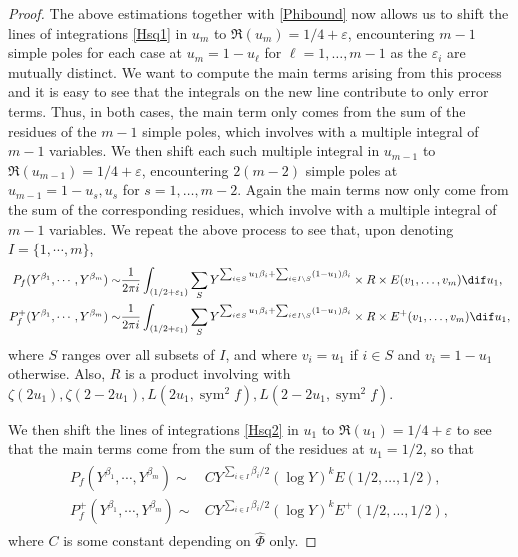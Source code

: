 \documentclass[twoside,leqno,10pt, A4]{amsart}
\begin{document}
\begin{proof}
    The above estimations together with \eqref{Phibound} now allows us to shift the lines of integrations \eqref{Hsq1} in $u_m$ to $\Re(u_m)=1/4+\varepsilon$,  encountering $m-1$ simple poles for each case at $u_m=1-u_{\ell}$ for $\ell=1,\dots, m-1$ as the $\varepsilon_i$ are mutually distinct. We want to compute the main terms arising from this process and it is easy to see that the integrals on the new line contribute to only error terms. Thus, in both cases, the main term only comes from the sum of the residues of the $m-1$ simple poles, which involves with a multiple integral of $m-1$ variables. We then shift each such multiple integral in $u_{m-1}$ to $\Re(u_{m-1})=1/4+\varepsilon$, encountering $2(m-2)$ simple poles at $u_{m-1}=1-u_{s}, u_s$ for $s=1,\dots, m-2$. Again the main terms now only come from the sum of the corresponding residues, which  involve with a multiple integral of $m-1$ variables. We repeat the above process to see that, upon denoting $I=\{1, \cdots, m\}$,
\begin{align}
 \label{Hsq2}
\begin{split}
 P_f(Y^{\beta_1}, \cdots, Y^{\beta_m}) \sim & \frac{1}{2\pi i}\int_{(1/2+\varepsilon_1)}\sum_{S}Y^{\sum_{i \in S}u_1\beta_i+\sum_{i \in I\backslash S}(1-u_1)\beta_i} \times R \times E(v_1, \ldots, v_{m})\dif u_1, \\
P^+_f(Y^{\beta_1}, \cdots, Y^{\beta_m}) \sim & \frac{1}{2\pi i}\int_{(1/2+\varepsilon_1)}\sum_{S}Y^{\sum_{i \in S}u_1\beta_i+\sum_{i \in I\backslash S}(1-u_1)\beta_i} \times R \times E^+(v_1, \ldots, v_{m})\dif u_1,
\end{split}
\end{align}
  where $S$ ranges over all subsets of $I$, and where $v_i=u_1$ if $i \in S$ and $v_i=1-u_1$ otherwise. Also, $R$ is a product involving with $\zeta(2u_1), \zeta(2-2u_1), L(2u_1, \operatorname{sym}^2f ), L(2-2u_1, \operatorname{sym}^2f )$.

  We then shift the lines of integrations \eqref{Hsq2} in $u_1$ to $\Re(u_1)=1/4+\varepsilon$ to see that the main terms come from the sum of the residues at $u_1=1/2$, so that
\begin{align}
\label{Hsq3}
\begin{split}
 P_f(Y^{\beta_1}, \cdots, Y^{\beta_m}) \sim & CY^{\sum_{i \in I}\beta_i/2} (\log Y)^k  E(1/2, \ldots, 1/2), \\
P^+_f(Y^{\beta_1}, \cdots, Y^{\beta_m}) \sim & CY^{\sum_{i \in I}\beta_i/2} (\log Y)^k  E^+(1/2, \ldots, 1/2),
\end{split}
\end{align}
  where $C$ is some constant depending on $\widehat{\Phi}$ only.


\end{proof}
\end{document}
